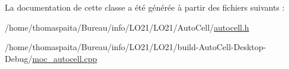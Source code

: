La documentation de cette classe a été générée à partir des fichiers suivants \+:\begin{DoxyCompactItemize}
\item 
/home/thomaspaita/\+Bureau/info/\+L\+O21/\+L\+O21/\+Auto\+Cell/\hyperlink{autocell_8h}{autocell.\+h}\item 
/home/thomaspaita/\+Bureau/info/\+L\+O21/\+L\+O21/build-\/\+Auto\+Cell-\/\+Desktop-\/\+Debug/\hyperlink{moc__autocell_8cpp}{moc\+\_\+autocell.\+cpp}\end{DoxyCompactItemize}
